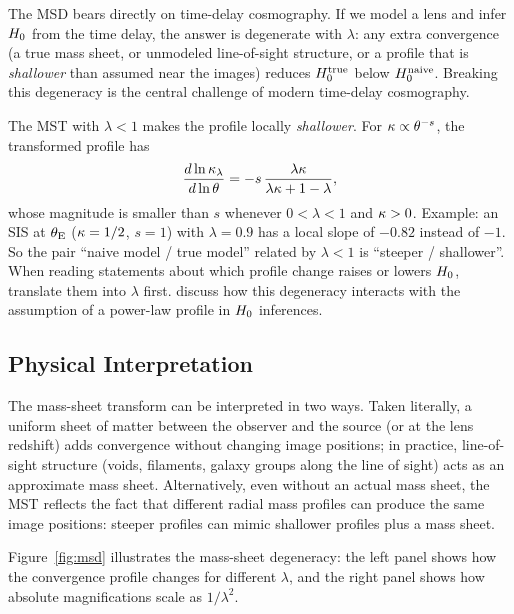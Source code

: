 \begin{remark}
The MSD bears directly on time-delay cosmography.  If we model a
lens and infer $H_0$ from the time delay, the answer is
degenerate with $\lambda$: any extra convergence (a true mass sheet, or
unmodeled line-of-sight structure, or a profile that is
\emph{shallower} than assumed near the images) reduces
$H_0^{\mathrm{true}}$ below
$H_0^{\mathrm{naive}}$.  Breaking this degeneracy is the central
challenge of modern time-delay cosmography.
\end{remark}

\begin{annotation}
The MST with $\lambda < 1$ makes the profile locally \emph{shallower}.  For
$\kappa \propto \theta^{-s}$, the transformed profile has
\[
  \frac{d\ln\kappa_\lambda}{d\ln\theta}
  = -s\,\frac{\lambda\kappa}{\lambda\kappa + 1 - \lambda},
\]
whose magnitude is smaller than $s$ whenever $0 < \lambda < 1$ and
$\kappa > 0$.  Example: an SIS at $\theta_{\mathrm{E}}$ ($\kappa = 1/2$, $s = 1$) with
$\lambda = 0.9$ has a local slope of $-0.82$ instead of $-1$.  So the pair
``naive model / true model'' related by $\lambda < 1$ is ``steeper / shallower''.
When reading statements about which profile change raises or lowers
$H_0$, translate them into $\lambda$ first.
\citet{schneider_sluse_2013} discuss how this degeneracy interacts with the
assumption of a power-law profile in $H_0$ inferences.
\end{annotation}


\subsection{Physical Interpretation}

The mass-sheet transform can be interpreted in two ways.  Taken
literally, a uniform sheet of matter between the observer and the
source (or at the lens redshift) adds convergence without changing
image positions; in practice, line-of-sight structure (voids,
filaments, galaxy groups along the line of sight) acts as an
approximate mass sheet.  Alternatively, even without an actual mass
sheet, the MST reflects the fact that different radial mass profiles
can produce the same image positions: steeper profiles can mimic
shallower profiles plus a mass sheet.

Figure~\ref{fig:msd} illustrates the mass-sheet degeneracy: the
left panel shows how the convergence profile changes for different
$\lambda$, and the right panel shows how absolute magnifications
scale as $1/\lambda^2$.

